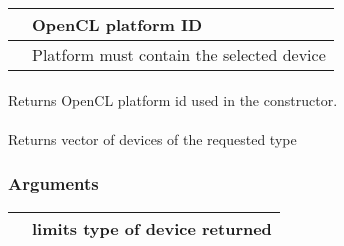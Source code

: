 \documentclass[letterpaper,10pt,english]{sphinxmanual}
\begin{document}
\begin{savenotes}\sphinxattablestart
\centering
\begin{tabulary}{\linewidth}[t]{|T|T|}
\hline

&
OpenCL platform ID
\\
\hline
{}
&
Platform must contain the selected device
\\
\hline
\end{tabulary}
\par
\sphinxattableend\end{savenotes}


\paragraph{}
\label{\detokenize{programming-interface/runtime/platform:get}}
\begin{sphinxVerbatim}[commandchars=\\\{\}]
  
\end{sphinxVerbatim}

Returns OpenCL platform id used in the constructor.


\paragraph{}
\label{\detokenize{programming-interface/runtime/platform:get-devices}}
\begin{sphinxVerbatim}[commandchars=\\\{\}]
 
      
\end{sphinxVerbatim}

Returns vector of devices of the requested type
\subsubsection*{Arguments}


\begin{savenotes}\sphinxattablestart
\centering
\begin{tabulary}{\linewidth}[t]{|T|T|}
\hline

&
limits type of device returned
\\
\hline
\end{tabulary}
\par
\sphinxattableend\end{savenotes}
\end{document}
